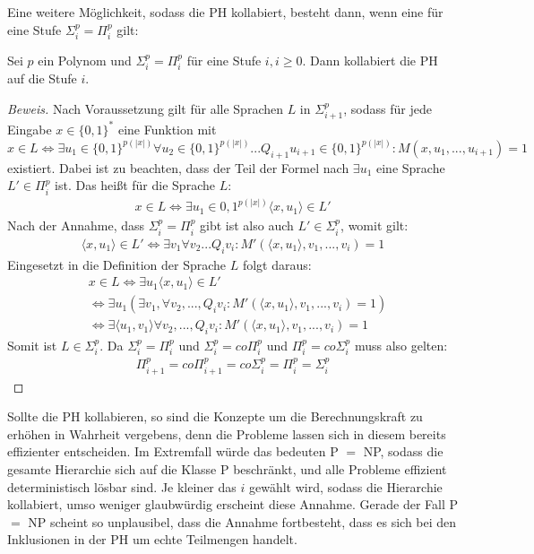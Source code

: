 Eine weitere Möglichkeit, sodass die PH kollabiert, besteht dann, wenn eine für eine Stufe $\Sigma^p_i = \Pi^p_i$ gilt:

\begin{theorem}
    Sei $p$ ein Polynom und $\Sigma^p_i = \Pi^p_i$ für eine Stufe $i, i \geq 0$. Dann kollabiert die PH auf die Stufe $i$.
\end{theorem}

\begin{proof}[Beweis] \cite{rothe_komplexitatstheorie_2008}
    Nach Voraussetzung gilt für alle Sprachen $L$ in $\Sigma^p_{i+1}$, sodass für jede Eingabe $x \in \{0,1\}^*$ eine Funktion mit 
    $$
    x \in L \Leftrightarrow \exists u_1 \in \{0,1\}^{p(|x|)} \forall u_2 \in \{0,1\}^{p(|x|)} ... Q_{i+1}u_{i + 1} \in \{0,1\}^{p(|x|)} : M(x, u_1, ..., u_{i+1}) = 1
    $$
    existiert.
    Dabei ist zu beachten, dass der Teil der Formel nach $\exists u_1$ eine Sprache $L' \in \Pi^p_i$ ist.
    Das heißt für die Sprache $L$:
    \begin{align*}
    x \in L \Leftrightarrow \exists u_1 \in {0,1}^{p(|x|)} \langle x, u_1 \rangle \in L'
    \end{align*}
    Nach der Annahme, dass  $\Sigma^p_i = \Pi^p_i$ gibt ist also auch $L' \in \Sigma^p_i$, womit gilt:
    \begin{align*}
    \langle x, u_1 \rangle \in L' \Leftrightarrow \exists v_1 \forall v_2 ... Q_i v_i : M'(\langle x, u_1 \rangle, v_1, ..., v_i) = 1 
    \end{align*}
    Eingesetzt in die Definition der Sprache $L$ folgt daraus:
    \begin{align*}
    & x \in L \Leftrightarrow \exists u_1 \langle x, u_1 \rangle \in L' \\
    & \Leftrightarrow \exists u_1 (\exists v_1, \forall v_2, ..., Q_i v_i :  M'(\langle x, u_1 \rangle, v_1, ..., v_i) = 1) \\
    & \Leftrightarrow \exists \langle u_1, v_1 \rangle \forall v_2, ..., Q_i v_i : M'(\langle x, u_1 \rangle, v_1, ..., v_i) = 1
    \end{align*}
    Somit ist $L \in \Sigma^p_i$. Da $\Sigma^p_i = \Pi^p_i$ und $\Sigma^p_i = co\Pi^p_i$ und $\Pi^p_i = co\Sigma^p_i$ muss also gelten:
    \begin{align*}
    \Pi^p_{i+1} = co\Pi^p_{i+1} = co\Sigma^p_i = \Pi^p_i = \Sigma^p_i
    \end{align*}
\end{proof}

Sollte die PH kollabieren, so sind die Konzepte um die Berechnungskraft zu erhöhen in Wahrheit vergebens, denn die Probleme lassen sich in diesem bereits effizienter entscheiden.
Im Extremfall würde das bedeuten P $=$ NP, sodass die gesamte Hierarchie sich auf die Klasse P beschränkt, und alle Probleme effizient deterministisch lösbar sind.
Je kleiner das $i$ gewählt wird, sodass die Hierarchie kollabiert, umso weniger glaubwürdig erscheint diese Annahme.
Gerade der Fall P $=$ NP scheint so unplausibel, dass die Annahme fortbesteht, dass es sich bei den Inklusionen in der PH um echte Teilmengen handelt.

